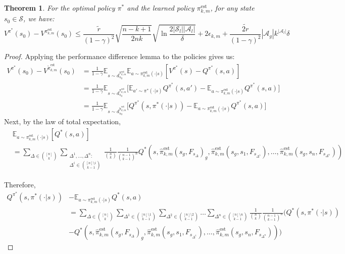 \documentclass{article}
\theoremstyle{plain}
\newtheorem{theorem}{Theorem}[section]
\theoremstyle{definition}
\def\est{\mathrm{est}}
\def\E{\mathbb{E}}
\begin{document}
\begin{theorem} \label{thm: optimality gap}For the optimal policy $\pi^*$ and the learned policy ${\pi}_{k,m}^\est$, for any state $s_0\in \mathcal{S}$, we have:
    \[V^{\pi^*}(s_0) - V^{{\pi}^\est_{k,m}}(s_0) \leq \frac{\tilde{r}}{(1-\gamma)^2}\sqrt{\frac{n-k+1}{2nk}} \sqrt{\ln\frac{2|\mathcal{S}_l||\mathcal{A}_l|}{\delta}}  + 2\epsilon_{k,m} +  \frac{\tilde{2r}}{(1-\gamma)^2}|\mathcal{A}_g|k^{|\mathcal{A}_l|}\delta\]
\end{theorem}
\begin{proof}Applying the performance difference lemma to the policies gives us:
\begin{align*}V^{\pi^*}(s_0) - V^{\tilde{\pi}^\est_{k,m}}(s_0) &= \frac{1}{1-\gamma}\E_{s\sim d_{s_0}^{{\pi}_{k,m}^\est}} \E_{a\sim {\pi}_{k,m}^\est(\cdot|s)} [V^{\pi^*}(s) - Q^{\pi^*}(s,a)] \\
&= \frac{1}{1-\gamma}\E_{s\sim d_{s_0}^{{\pi}_{k,m}^\est}} \bigg[\E_{a'\sim \pi^*(\cdot|s)}Q^{\pi^*}(s,a') - \E_{a\sim {\pi}_{k,m}^\est(\cdot|s)} Q^{\pi^*}(s,a)\bigg] \\
&= \frac{1}{1-\gamma}\E_{s\sim d_{s_0}^{\tilde{\pi}_{k,m}^\est}} \bigg[Q^{\pi^*}(s,\pi^*(\cdot|s)) - \E_{a\sim {\pi}_{k,m}^\est(\cdot|s)} Q^{\pi^*}(s,a)\bigg]
\end{align*}
Next, by the law of total expectation,
\begin{align*}&\E_{a\sim {\pi}_{k,m}^\est(\cdot|s)}\left[Q^*(s,a)\right] \\
&= \sum_{\Delta\in {[n]\choose k}}\sum_{\substack{\Delta^1,\dots,\Delta^n:\\  \Delta^i \in {[n]\setminus i\choose k-1}}} \frac{1}{{n\choose k}}\frac{1}{{n-1 \choose k-1}^n} Q^*(s, \hat{\pi}_{k,m}^\est(s_g,F_{s_\Delta})_g, \hat{\pi}_{k,m}^\est(s_g, s_{1}, F_{s_{\Delta^1}}),\dots,\hat{\pi}_{k,m}^\est(s_g, s_{n}, F_{s_{\Delta^n}}))\end{align*}

Therefore,
\begin{align*}Q^{\pi^*}(s,\pi^*(\cdot|s)) &- \E_{a\sim {\pi}_{k,m}^\est(\cdot|s)} Q^*(s,a) \\
&=\sum_{\Delta\in {[n]\choose k}}\sum_{\Delta^1 \in {[n]\setminus 1 \choose k-1}}\sum_{\Delta^2 \in {[n]\setminus 2 \choose k-1}}\dots\sum_{\Delta^n \in {[n]\setminus n \choose k-1}}\frac{1}{{n\choose k}}\frac{1}{{n-1 \choose k-1}^n}\bigg(Q^*(s,\pi^*(\cdot|s)) \\
&-Q^*(s, \hat{\pi}_{k,m}^\est(s_g,F_{s_\Delta})_g, \hat{\pi}_{k,m}^\est(s_g, s_{1},F_{s_{\Delta^1}}),\dots,\hat{\pi}_{k,m}^\est(s_g, s_{n},F_{s_{\Delta^n}}))\bigg)
\end{align*}


\end{proof}
\end{document}
